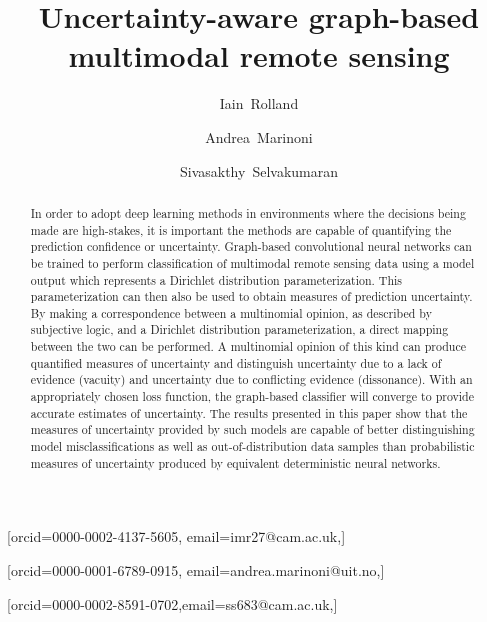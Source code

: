\documentclass[
twocolumn,
]{ceurart}
\begin{document}


\title{Uncertainty-aware graph-based multimodal remote sensing}

\author[1]{Iain~Rolland}[orcid=0000-0002-4137-5605, email=imr27@cam.ac.uk,]

\address[1]{Department of Engineering, University of Cambridge, Cambridge, CB2 1PZ United Kingdom}
\address[2]{Department of Physics and Technology, UiT the Arctic University of Norway, P.O. box 6050 Langnes, NO-9037, Tromsø, Norway}

\author[1,2]{Andrea~Marinoni}[orcid=0000-0001-6789-0915, email=andrea.marinoni@uit.no,]

\author[1]{Sivasakthy~Selvakumaran}[orcid=0000-0002-8591-0702,email=ss683@cam.ac.uk,]

\begin{abstract}
In order to adopt deep learning methods in environments where the decisions being made are high-stakes, it is important the methods are capable of quantifying the prediction confidence or uncertainty.
Graph-based convolutional neural networks can be trained to perform classification of multimodal remote sensing data using a model output which represents a Dirichlet distribution parameterization.
This parameterization can then also be used to obtain measures of prediction uncertainty.
By making a correspondence between a multinomial opinion, as described by subjective logic, and a Dirichlet distribution parameterization, a direct mapping between the two can be performed.
A multinomial opinion of this kind can produce quantified measures of uncertainty and distinguish uncertainty due to a lack of evidence (vacuity) and uncertainty due to conflicting evidence (dissonance).
With an appropriately chosen loss function, the graph-based classifier will converge to provide accurate estimates of uncertainty.
The results presented in this paper show that the measures of uncertainty provided by such models are capable of better distinguishing model misclassifications as well as out-of-distribution data samples than probabilistic measures of uncertainty produced by equivalent deterministic neural networks.
\end{abstract}
\end{document}
